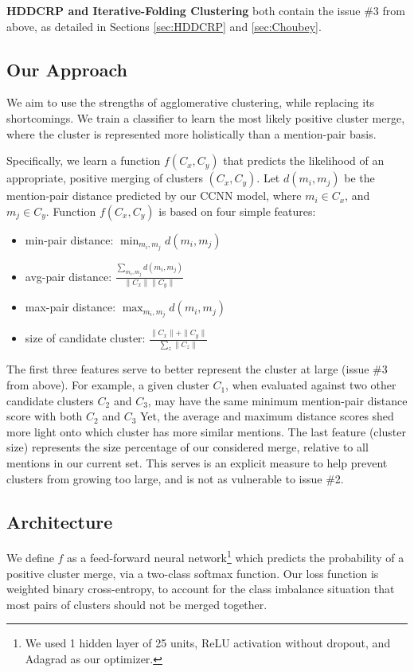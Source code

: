 \documentclass[11pt,a4paper]{article}
\begin{document}
\textbf{HDDCRP and Iterative-Folding Clustering} both contain the issue \#3 from above, as detailed in Sections \ref{sec:HDDCRP} and \ref{sec:Choubey}.

\subsection{Our Approach}
We aim to use the strengths of agglomerative clustering, while replacing its shortcomings.  We train a classifier to learn the most likely {positive cluster merge}, where the cluster is represented more holistically than a mention-pair basis.

Specifically, we learn a function $f(C_x,C_y)$ that predicts the likelihood of an appropriate, positive merging of clusters $(C_x,C_y)$. Let $d(m_i,m_j)$ be the mention-pair distance predicted by our CCNN model, where $m_i \in C_x$, and $m_j \in C_y$.  Function $f(C_x,C_y)$ is based on four simple features:
\begin{itemize}
  \item min-pair distance: $\min_{m_i,m_j} d(m_i,m_j)$
  \item avg-pair distance: $\frac{\sum_{m_i, m_j} d(m_i,m_j)}{\|C_x\|\|C_y\|}$
  \item max-pair distance: $\max_{m_i,m_j} d(m_i,m_j)$
  \item size of candidate cluster: $\frac{\|C_x\| + \|C_y\|}{\sum_{z}{\|C_z\|}}$
\end{itemize}

The first three features serve to better represent the cluster at large (issue \#3 from above).  For example, a given cluster $C_1$, when evaluated against two other candidate clusters $C_2$ and $C_3$, may have the same minimum mention-pair distance score with both $C_2$ and $C_3$  Yet, the average and maximum distance scores shed more light onto which cluster has more similar mentions. The last feature (cluster size) represents the size percentage of our considered merge, relative to all mentions in our current set.  This serves is an explicit measure to help prevent clusters from growing too large, and is not as vulnerable to issue \#2.

\subsection{Architecture}
We define $f$ as a feed-forward neural network\footnote{We used 1 hidden layer of 25 units, ReLU activation without dropout, and Adagrad as our optimizer.} which predicts the probability of a positive cluster merge, via a two-class softmax function.  Our loss function is weighted binary cross-entropy, to account for the class imbalance situation that most pairs of clusters should not be merged together.  
\end{document}

